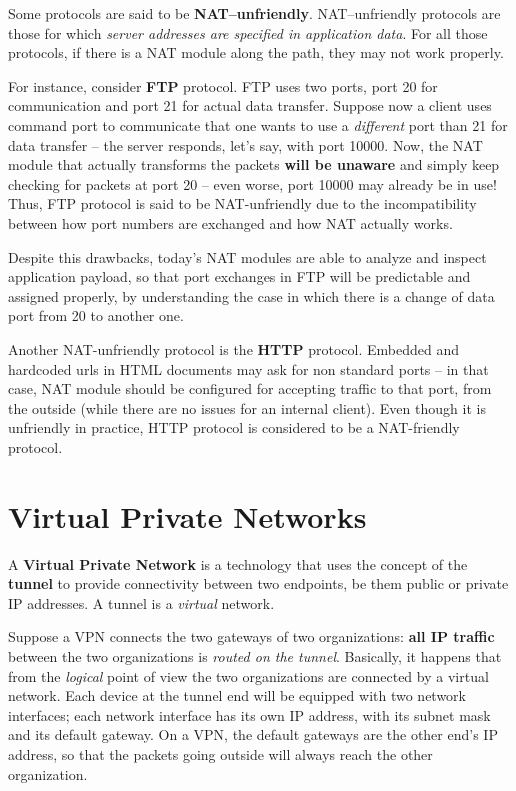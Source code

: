 \documentclass[10pt]{extbook}
\begin{document}
Some protocols are said to be \textbf{NAT--unfriendly}. NAT--unfriendly
protocols are those for which \emph{server addresses are specified in
application data}. For all those protocols, if there is a NAT module along the
path, they may not work properly.

For instance, consider \textbf{FTP} protocol. FTP uses two ports, port 20 for
communication and port 21 for actual data transfer. Suppose now a client uses
command port to communicate that one wants to use a \emph{different} port than
21 for data transfer -- the server responds, let's say, with port 10000. Now,
the NAT module that actually transforms the packets \textbf{will be unaware}
and simply keep checking for packets at port 20 -- even worse, port 10000 may
already be in use! Thus, FTP protocol is said to be NAT-unfriendly due to the
incompatibility between how port numbers are exchanged and how NAT actually
works.

Despite this drawbacks, today's NAT modules are able to analyze and inspect
application payload, so that port exchanges in FTP will be predictable and
assigned properly, by understanding the case in which there is a change of data
port from 20 to another one.

Another NAT-unfriendly protocol is the \textbf{HTTP} protocol. Embedded and
hardcoded urls in HTML documents may ask for non standard ports -- in that
case, NAT module should be configured for accepting traffic to that port, from
the outside (while there are no issues for an internal client). Even though it
is unfriendly in practice, HTTP protocol is considered to be a NAT-friendly
protocol.

\chapter{Virtual Private Networks}

A \textbf{Virtual Private Network} is a technology that uses the concept of the
\textbf{tunnel} to provide connectivity between two endpoints, be them public
or private IP addresses. A tunnel is a \emph{virtual} network.

Suppose a VPN connects the two gateways of two organizations: \textbf{all IP
traffic} between the two organizations is \emph{routed on the tunnel}.
Basically, it happens that from the \emph{logical} point of view the two
organizations are connected by a virtual network. Each device at the tunnel end
will be equipped with two network interfaces; each network interface has its
own IP address, with its subnet mask and its default gateway. On a VPN, the
default gateways are the other end's IP address, so that the packets going
outside will always reach the other organization.
\end{document}
